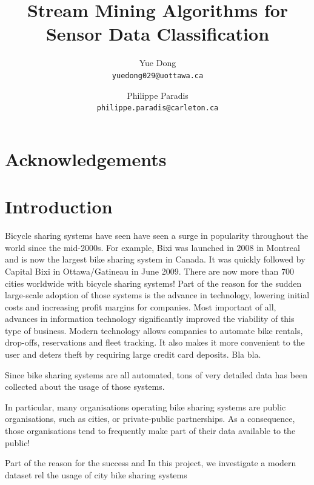 \documentclass[12pt]{article}
\title{Stream Mining Algorithms for Sensor Data Classification}
\author{
	Yue Dong\\
	\texttt{yuedong029@uottawa.ca}
	\and
	Philippe Paradis\\
	\texttt{philippe.paradis@carleton.ca}
}
\begin{document}
	\singlespace
	\maketitle
	
	\tableofcontents
	\newpage
	\section*{Acknowledgements}
	
	
	\begin{abstract}                %
		
		
	\end{abstract}
	
	\setcounter{secnumdepth}{4}
	
	\section{Introduction}
	\label{sec:introduction}

        Bicycle sharing systems have seen have seen a surge in popularity throughout the world since the mid-2000s. For example, Bixi was launched in 2008 in Montreal and is now the largest bike sharing system in Canada. It was quickly followed by Capital Bixi in Ottawa/Gatineau in June 2009. There are now more than 700 cities worldwide with bicycle sharing systems! Part of the reason for the sudden large-scale adoption of those systems is the advance in technology, lowering initial costs and increasing profit margins for companies. Most important of all, advances in information technology significantly improved the viability of this type of business. Modern technology allows companies to automate bike rentals, drop-offs, reservations and fleet tracking. It also makes it more convenient to the user and deters theft by requiring large credit card deposits. Bla bla.

Since bike sharing systems are all automated, tons of very detailed data has been collected about the usage of those systems.

In particular, many organisations operating bike sharing systems are public organisations, such as cities, or private-public partnerships. As a consequence, those organisations tend to frequently make part of their data available to the public!

Part of the reason for the success and 
        In this project, we investigate a modern dataset rel the usage of city bike sharing systems
	
\end{document}
